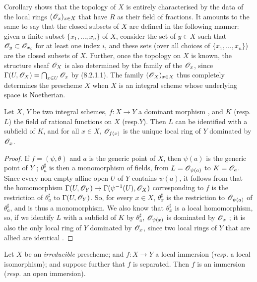 \begin{env}[8.2.6]
\label{1.8.2.6}
Corollary  shows that the topology of $X$ is
entirely characterised by the data of the local rings $(\mathscr{O}_x)_{x\in X}$ that
have $R$ as their field of fractions. It amounts to the same to say that the
closed subsets of $X$ are defined in the following manner: given a finite subset
$\{x_1,\ldots,x_n\}$ of $X$, consider the set of $y\in X$ such that
$\mathscr{O}_y\subset\mathscr{O}_{x_i}$ for at least one index $i$, and these sets (over all
choices of $\{x_1,\ldots,x_n\}$) are the closed subsets of $X$. Further, once
the topology on $X$ is known, the structure sheaf $\mathscr{O}_X$ is also determined by
the family of the $\mathscr{O}_x$, since $\Gamma(U,\mathscr{O}_X)=\bigcap_{x\in U}\mathscr{O}_x$ by
(8.2.1.1). The family $(\mathscr{O}_X)_{x\in X}$ thus completely determines the
prescheme $X$ when $X$ is an integral scheme whose underlying space is
Noetherian.
\end{env}

\begin{prop}[8.2.7]
\label{1.8.2.7}
Let $X$, $Y$ be two integral schemes, $f:X\to Y$ a dominant morphism
, and $K$ (resp.$L$) the field of rational
functions on $X$ (resp.$Y$). Then $L$ can be identified with a subfield of
$K$, and for all $x\in X$, $\mathscr{O}_{f(x)}$ is the unique local ring of $Y$ dominated
by $\mathscr{O}_x$.
\end{prop}

\begin{proof}
\label{proof-1.8.2.7}
If $f=(\psi,\theta)$ and $a$ is the generic point of $X$, then
$\psi(a)$ is the generic point of $Y$ ; $\theta_a^\sharp$ is then
a monomorphism of fields, from $L=\mathscr{O}_{\psi(a)}$ to $K=\mathscr{O}_a$. Since every
non-empty affine open $U$ of $Y$ contains $\psi(a)$, it follows from
 that the homomorphism $\Gamma(U,\mathscr{O}_Y)\to\Gamma(\psi^{-1}(U),\mathscr{O}_X)$
corresponding to $f$ is the restriction of $\theta_a^\sharp$ to $\Gamma(U,\mathscr{O}_Y)$.
So, for every $x\in X$, $\theta_x^\sharp$ is the restriction to $\mathscr{O}_{\psi(a)}$ of
$\theta_a^\sharp$, and is thus a monomorphism. We also know that $\theta_x^\sharp$ is a
local homomorphism, so, if we identify $L$ with a subfield of $K$ by
$\theta_a^\sharp$, $\mathscr{O}_{\psi(x)}$ is dominated by $\mathscr{O}_x$ ; it is also
the only local ring of $Y$ dominated by $\mathscr{O}_x$, since two local rings of $Y$
that are allied are identical .
\end{proof}

\begin{prop}[8.2.8]
\label{1.8.2.8}
Let $X$ be an {\em irreducible} prescheme; and
$f:X\to Y$ a local immersion ({\em resp.} a local isomorphism); and
suppose further that $f$ is separated. Then $f$ is an immersion ({\em resp.}
an open immersion).
\end{prop}

